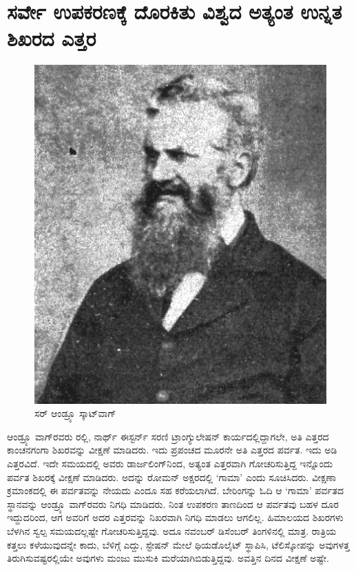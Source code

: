 
\chapter{ಸರ್ವೇ ಉಪಕರಣಕ್ಕೆ ದೊರಕಿತು ವಿಶ್ವದ ಅತ್ಯಂತ ಉನ್ನತ ಶಿಖರದ ಎತ್ತರ}

\vskip -12pt

\begin{figure}[!hbtp]
\includegraphics[scale=1.1]{"images/image021.jpg"}
\caption{ಸರ್ ಆಂಡ್ರ್ಯೂ ಸ್ಕಾಟ್‌ವಾಗ್​}\label{chap15-fig1}
\end{figure}

ಆಂಡ್ರ್ಯೂ ವಾಗ್​ರವರು ರಲ್ಲಿ, ನಾರ್ಥ್ ಈಸ್ಟರ್ನ್ ಸರಣಿ ಟ್ರಾಂಗ್ಯುಲೇಷನ್​ ಕಾರ್ಯದಲ್ಲಿದ್ದಾಗಲೇ, ಅತಿ ಎತ್ತರದ ಕಾಂಚನಗಂಗಾ ಶಿಖರವನ್ನು ವೀಕ್ಷಣೆ ಮಾಡಿದರು. ಇದು ಪ್ರಪಂಚದ ಮೂರನೇ ಅತಿ ಎತ್ತರದ ಪರ್ವತ. ಇದು  ಅಡಿ ಎತ್ತರವಿದೆ. ಇದೇ ಸಮಯದಲ್ಲಿ ಅವರು ಡಾರ್ಜಲಿಂಗ್​ನಿಂದ, ಅತ್ಯಂತ ಎತ್ತರವಾಗಿ ಗೋಚರಿಸುತ್ತಿದ್ದ ಇನ್ನೊಂದು ಪರ್ವತ ಶಿಖರಕ್ಕೆ ವೀಕ್ಷಣೆ ಮಾಡಿದರು. ಅದನ್ನು ರೋಮನ್​ ಅಕ್ಷರದಲ್ಲಿ ‘ಗಾಮಾ’ ಎಂದು ಸೂಚಿಸಿದರು. ವೀಕ್ಷಣಾ ಕ್ರಮಾಂಕದಲ್ಲಿ ಈ ಪರ್ವತವನ್ನು ನೇಯದು ಎಂದೂ ಸಹ ಕರೆಯಲಾಗಿದೆ. ಬೇರಿಂಗನ್ನು ಓದಿ ಆ ‘ಗಾಮಾ’ ಪರ್ವತದ ಸ್ಥಾನವನ್ನು ಆಂಡ್ರ್ಯೂ ವಾಗ್​ರವರು ನಿಗಧಿ ಮಾಡಿದರು. ನಿಂತ ಉಪಕರಣ ತಾಣದಿಂದ ಆ ಪರ್ವತವು ಬಹಳ ದೂರ ಇದ್ದುದರಿಂದ, ಆಗ ಅವರಿಗೆ ಅದರ ಎತ್ತರವನ್ನು ನಿಖರವಾಗಿ ನಿಗಧಿ ಮಾಡಲು ಆಗಲಿಲ್ಲ. ಹಿಮಾಲಯದ ಶಿಖರಗಳು ಬೆಳಗಿನ ಸ್ವಲ್ಪ ಸಮಯದಲ್ಲಷ್ಟೇ ಗೋಚರಿಸುತ್ತಿದ್ದವು. ಅದೂ ನವಂಬರ್​ ಡಿಸೆಂಬರ್​ ತಿಂಗಳಿನಲ್ಲಿ ಮಾತ್ರ. ರಾತ್ರಿಯ ಕತ್ತಲು ಕಳೆಯುವುದನ್ನೇ ಕಾದು, ಬೆಳಿಗ್ಗೆ ಎದ್ದು, ಸ್ಟೇಷನ್​ ಮೇಲೆ ಥಿಯಡೊಲೈಟ್​ ಸ್ಥಾಪಿಸಿ, ಟೆಲಿಸ್ಕೋಪನ್ನು ಅವುಗಳತ್ತ ತಿರುಗಿಸುವಷ್ಟರಲ್ಲಿಯೇ ಅವುಗಳು ಮಂಜು ಮುಸುಕಿ ಮರೆಯಾಗಿಬಿಡುತ್ತಿದ್ದವು. ಅವತ್ತಿನ ದಿನದ ವೀಕ್ಷಣೆ ಅಷ್ಟೇ.

